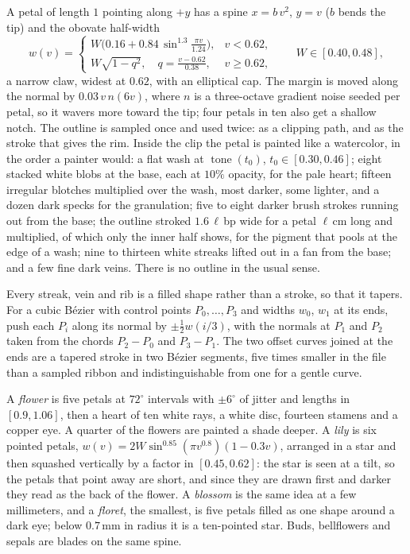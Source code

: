 \begin{construction}[Petal]
A petal of length $1$ pointing along $+y$ has a spine $x=b\,v^2$, $y=v$ ($b$ bends the
tip) and the obovate half-width
\[
  w(v)=\begin{cases}
    W\bigl(0.16+0.84\,\sin^{1.3}\frac{\pi v}{1.24}\bigr), & v<0.62,\\[2pt]
    W\sqrt{1-q^2},\quad q=\frac{v-0.62}{0.38}, & v\ge 0.62,
  \end{cases}
  \qquad W\in[0.40,0.48],
\]
a narrow claw, widest at $0.62$, with an elliptical cap. The margin is moved along the
normal by $0.03\,v\,n(6v)$, where $n$ is a three-octave gradient noise seeded per petal, so
it wavers more toward the tip; four petals in ten also get a shallow notch. The outline is
sampled once and used twice: as a clipping path, and as the stroke that gives the rim.
Inside the clip the petal is painted like a watercolor, in the order a painter would: a
flat wash at $\operatorname{tone}(t_0)$, $t_0\in[0.30,0.46]$; eight stacked white blobs at
the base, each at $10\%$ opacity, for the pale heart; fifteen irregular blotches
multiplied over the wash, most darker, some lighter, and a dozen dark specks for the
granulation; five to eight darker brush strokes running out from the base; the outline
stroked $1.6\,\ell\,$bp wide for a petal $\ell\,$cm long and multiplied, of which only the inner half shows, for the pigment
that pools at the edge of a wash; nine to thirteen white streaks lifted out in a fan from
the base; and a few fine dark veins. There is no outline in the usual sense.
\end{construction}

\begin{construction}
Every streak, vein and rib is a filled shape rather than a stroke, so that it tapers. For a
cubic B\'ezier with control points $P_0,\dots,P_3$ and widths $w_0$, $w_1$ at its ends, push
each $P_i$ along its normal by $\pm\frac12 w(i/3)$, with the normals at $P_1$ and $P_2$ taken
from the chords $P_2-P_0$ and $P_3-P_1$. The two offset curves joined at the ends are a
tapered stroke in two B\'ezier segments, five times smaller in the file than a sampled
ribbon and indistinguishable from one for a gentle curve.
\end{construction}

\begin{construction}[Flowers]
A \emph{flower} is five petals at $72^\circ$ intervals with $\pm6^\circ$ of jitter and lengths
in $[0.9,1.06]$, then a heart of ten white rays, a white disc, fourteen stamens and a copper
eye. A quarter of the flowers are painted a shade deeper. A \emph{lily} is six pointed
petals, $w(v)=2W\sin^{0.85}(\pi v^{0.8})(1-0.3v)$, arranged in a star and then squashed
vertically by a factor in $[0.45,0.62]$: the star is seen at a tilt, so the petals that point
away are short, and since they are drawn first and darker they read as the back of the
flower. A \emph{blossom} is the same idea at a few millimeters, and a \emph{floret}, the
smallest, is five petals filled as one shape around a dark eye; below $0.7\,$mm in radius it is a
ten-pointed star. Buds, bellflowers and sepals are blades on the same spine.
\end{construction}


